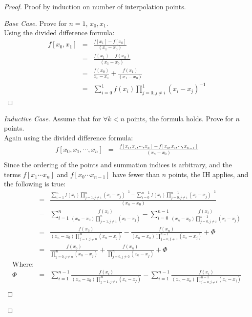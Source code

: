 \documentclass{article}
\begin{document}
\begin{proof}
	Proof by induction on number of interpolation points.
	\begin{proof}[Base Case] Prove for $n=1$, $x_0,x_1$.\\
	Using the divided difference formula:
	\begin{eqnarray*}
	f[x_0,x_1]&=&\frac{f[x_1]-f[x_0]}{(x_1-x_0)}\\
	&=&\frac{f(x_1)-f(x_0)}{(x_1-x_0)}\\
	&=&\frac{f(x_0)}{x_0-x_1}+\frac{f(x_1)}{(x_1-x_0)}\\
	&=&\sum_{i=0}^{1}f(x_i)\prod_{j=0,j\neq i}^{1} (x_i - x_j)^{-1}
	\end{eqnarray*}
	\end{proof}
	\begin{proof}[Inductive Case] Assume that for $\forall k<n$ points, the formula holds.  Prove for $n$ points.\\
	Again using the divided difference formula:
	\begin{eqnarray*}
		f[x_0,x_1,\cdots,x_n] &=& 
			\frac{ f[x_1,x_2,\cdots,x_n] - f[x_0,x_1,\cdots,x_{n-1}] }
			     { (x_n-x_0) }\\
	\end{eqnarray*}
	Since the ordering of the points and summation indices is arbitrary, and the
	terms $f[x_1\cdots x_n]$ and $f[x_0\cdots x_{n-1}]$ have fewer than $n$ points,
	the IH applies, and the following is true:
	\begin{eqnarray*}
		&=& \frac{\sum_{i=1}^{n} f(x_i) \prod_{j=1,j\neq i}^{n} (x_i - x_j)^{-1} 
		        - \sum_{i=0}^{n-1} f(x_i) \prod_{j=0,j\neq i}^{n-1} (x_i - x_j)^{-1}}
		         { (x_n-x_0) } \\
		&=& \sum_{i=1}^{n} \frac{f(x_i)}{(x_n-x_0) \prod_{j=1,j\neq i}^{n} (x_i - x_j)} - 
		    \sum_{i=0}^{n-1} \frac{f(x_i)}{(x_n-x_0) \prod_{j=0,j\neq i}^{n-1} (x_i - x_j)} \\
		&=& \frac{f(x_0)}{(x_n-x_0)\prod_{j=1,j\neq n}^{n} (x_n - x_j)} - 
		    \frac{f(x_n)}{(x_n-x_0)\prod_{j=0,j\neq 0}^{n-1} (x_0 - x_j)} + \Phi\\
		&=& \frac{f(x_0)}{\prod_{j=0,j\neq n}^{n} (x_n - x_j)} + 
		    \frac{f(x_n)}{\prod_{j=0,j\neq 0}^{n} (x_0 - x_j)} + \Phi\\
		\textrm{Where:} \\
		\Phi &=& 
			\sum_{i=1}^{n-1} \frac{f(x_i)}{(x_n-x_0) \prod_{j=1,j\neq i}^{n} (x_i - x_j)} -
			\sum_{i=1}^{n-1} \frac{f(x_i)}{(x_n-x_0) \prod_{j=0,j\neq i}^{n-1} (x_i - x_j)} \\

\end{eqnarray*}
\end{proof}
\end{proof}
\end{document}
